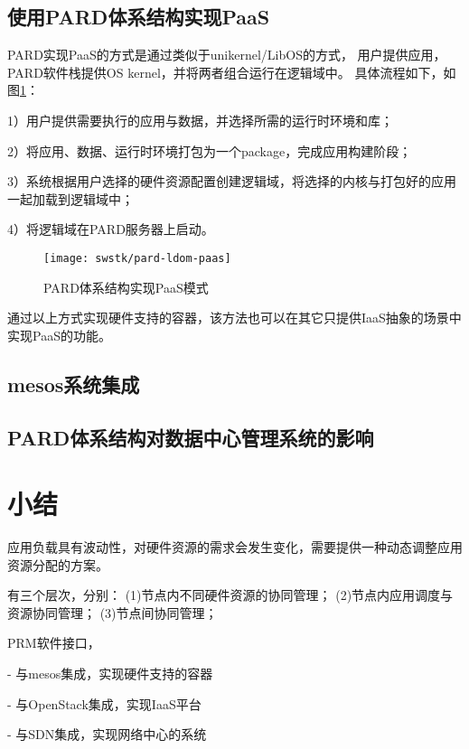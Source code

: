 \subsection{使用PARD体系结构实现PaaS}
PARD实现PaaS的方式是通过类似于unikernel/LibOS的方式，
用户提供应用，PARD软件栈提供OS kernel，并将两者组合运行在逻辑域中。
具体流程如下，如图\ref{fig:pard-ldom-paas}：

1）用户提供需要执行的应用与数据，并选择所需的运行时环境和库；

2）将应用、数据、运行时环境打包为一个package，完成应用构建阶段；

3）系统根据用户选择的硬件资源配置创建逻辑域，将选择的内核与打包好的应用一起加载到逻辑域中；

4）将逻辑域在PARD服务器上启动。

\begin{figure}[tb]
  \centering
  \texttt{[image: swstk/pard-ldom-paas]}
  \caption{PARD体系结构实现PaaS模式}
  \label{fig:pard-ldom-paas}
\end{figure}

通过以上方式实现硬件支持的容器，该方法也可以在其它只提供IaaS抽象的场景中实现PaaS的功能。

\subsection{mesos系统集成}



\subsection{PARD体系结构对数据中心管理系统的影响}

\section{小结}


应用负载具有波动性，对硬件资源的需求会发生变化，需要提供一种动态调整应用资源分配的方案。

有三个层次，分别：
(1)节点内不同硬件资源的协同管理；
(2)节点内应用调度与资源协同管理；
(3)节点间协同管理；


PRM软件接口，

- 与mesos集成，实现硬件支持的容器

- 与OpenStack集成，实现IaaS平台

- 与SDN集成，实现网络中心的系统

